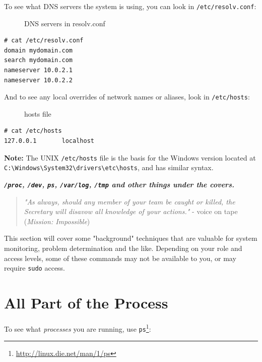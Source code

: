 \documentclass[10pt,]{book}
\renewcommand{\href}[2]{#2\footnote{\url{#1}}}
\numberwithin{figure}{chapter}
\DeclareRobustCommand{\drcap}[1]{\begin{figure}[H]\caption{#1}\end{figure}}
\DeclareRobustCommand{\drcmd}[1]{\index{Commands!#1}}
\begin{document}
To see what DNS servers the system is using, you can look in
\texttt{/etc/resolv.conf}:

\drcap{DNS servers in resolv.conf}

\begin{verbatim}
# cat /etc/resolv.conf
domain mydomain.com
search mydomain.com
nameserver 10.0.2.1
nameserver 10.0.2.2
\end{verbatim}

And to see any local overrides of network names or aliases, look in
\texttt{/etc/hosts}:

\drcap{hosts file}

\begin{verbatim}
# cat /etc/hosts
127.0.0.1       localhost
\end{verbatim}

\textbf{Note:} The UNIX \texttt{/etc/hosts} file is the basis for the
Windows version located at
\texttt{C:\textbackslash{}Windows\textbackslash{}System32\textbackslash{}drivers\textbackslash{}etc\textbackslash{}hosts},
and has similar syntax.


\textbf{\emph{\texttt{/proc}, \texttt{/dev}, \texttt{ps},
\texttt{/var/log}, \texttt{/tmp} and other things under the covers.}}

\begin{quote}
\emph{"As always, should any member of your team be caught or killed,
the Secretary will disavow all knowledge of your actions."} - voice on
tape (\emph{Mission: Impossible})
\end{quote}

This section will cover some "background" techniques that are valuable
for system monitoring, problem determination and the like. Depending on
your role and access levels, some of these commands may not be available
to you, or may require \texttt{sudo} access.

\section*{All Part of the Process}\label{all-part-of-the-process}

To see what \emph{processes} you are running, use
\href{http://linux.die.net/man/1/ps}{\texttt{ps}}\drcmd{ps}:
\end{document}
